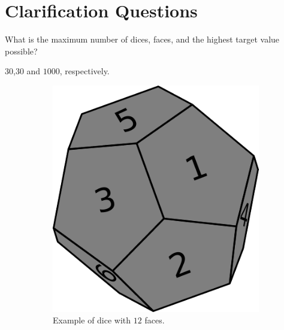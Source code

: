\section{Clarification Questions}

\begin{QandA}
	\item What is the maximum number of dices, faces, and the highest target value possible?
	\begin{answered}
		$30$,$30$ and $1000$, respectively.
	\end{answered}
	
\end{QandA}

\begin{figure}
	\centering
	\begin{subfigure}[t]{0.25\textwidth}
		\includegraphics[width=1\linewidth]{sources/dice_rolls/images/3d_dices}
		\caption{Example of dice with $12$ faces.}
		\label{fig:dice_rolls:12faces_dice}
	 \end{subfigure}
	\hfill
	\begin{subfigure}[t]{0.25\textwidth}

\end{subfigure}
\end{figure}
